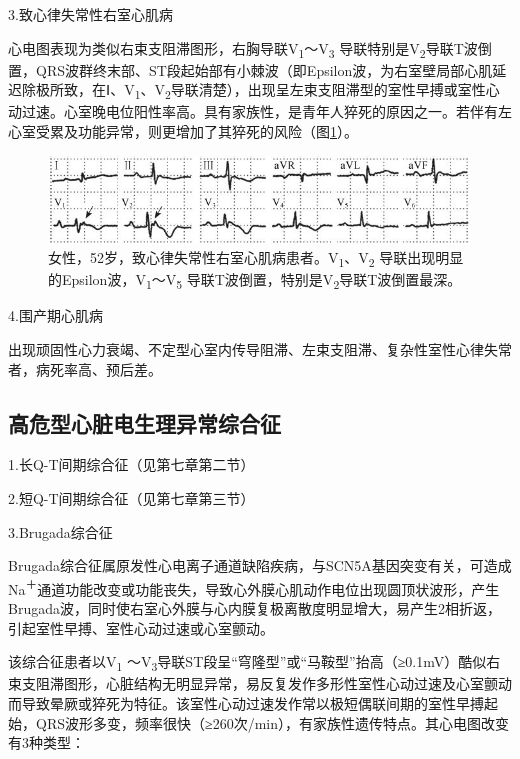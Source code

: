 3.致心律失常性右室心肌病

心电图表现为类似右束支阻滞图形，右胸导联V\textsubscript{1}～V\textsubscript{3} 导联特别是V\textsubscript{2}导联T波倒置，QRS波群终末部、ST段起始部有小棘波（即Epsilon波，为右室壁局部心肌延迟除极所致，在Ⅰ、V\textsubscript{1}、V\textsubscript{2}导联清楚），出现呈左束支阻滞型的室性早搏或室性心动过速。心室晚电位阳性率高。具有家族性，是青年人猝死的原因之一。若伴有左心室受累及功能异常，则更增加了其猝死的风险（图\ref{fig34-9}）。

\begin{figure}[!htbp]
 \centering
 \includegraphics[width=4.40625in,height=0.91667in]{./images/Image00549.jpg}
 \captionsetup{justification=centering}
 \caption{女性，52岁，致心律失常性右室心肌病患者。V\textsubscript{1}、V\textsubscript{2} 导联出现明显的Epsilon波，V\textsubscript{1}～V\textsubscript{5} 导联T波倒置，特别是V\textsubscript{2}导联T波倒置最深。}
 \label{fig34-9}
  \end{figure} 


4.围产期心肌病

出现顽固性心力衰竭、不定型心室内传导阻滞、左束支阻滞、复杂性室性心律失常者，病死率高、预后差。

\protect\hypertarget{text00041.htmlux5cux23subid451}{}{}

\subsection{高危型心脏电生理异常综合征}

1.长Q-T间期综合征（见第七章第二节）

2.短Q-T间期综合征（见第七章第三节）

3.Brugada综合征

Brugada综合征属原发性心电离子通道缺陷疾病，与SCN5A基因突变有关，可造成Na\textsuperscript{＋}通道功能改变或功能丧失，导致心外膜心肌动作电位出现圆顶状波形，产生Brugada波，同时使右室心外膜与心内膜复极离散度明显增大，易产生2相折返，引起室性早搏、室性心动过速或心室颤动。

该综合征患者以V\textsubscript{1} ～V\textsubscript{3}导联ST段呈“穹隆型”或“马鞍型”抬高（≥0.1mV）酷似右束支阻滞图形，心脏结构无明显异常，易反复发作多形性室性心动过速及心室颤动而导致晕厥或猝死为特征。该室性心动过速发作常以极短偶联间期的室性早搏起始，QRS波形多变，频率很快（≥260次/min），有家族性遗传特点。其心电图改变有3种类型：

